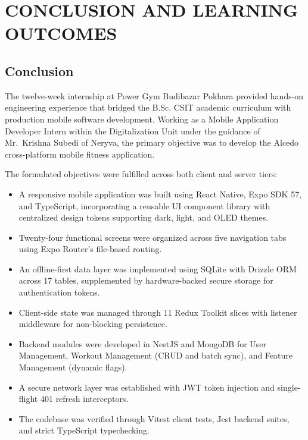 %
\chapter{CONCLUSION AND LEARNING OUTCOMES}

\section{Conclusion}
The twelve-week internship at Power Gym Budibazar Pokhara provided hands-on engineering experience that bridged the B.Sc. CSIT academic curriculum with production mobile software development. Working as a Mobile Application Developer Intern within the Digitalization Unit under the guidance of Mr.~Krishna Subedi of Neryva, the primary objective was to develop the Alcedo cross-platform mobile fitness application.

The formulated objectives were fulfilled across both client and server tiers:
\begin{itemize}
    \item A responsive mobile application was built using React Native, Expo SDK 57, and TypeScript, incorporating a reusable UI component library with centralized design tokens supporting dark, light, and OLED themes.
    \item Twenty-four functional screens were organized across five navigation tabs using Expo Router's file-based routing.
    \item An offline-first data layer was implemented using SQLite with Drizzle ORM across 17 tables, supplemented by hardware-backed secure storage for authentication tokens.
    \item Client-side state was managed through 11 Redux Toolkit slices with listener middleware for non-blocking persistence.
    \item Backend modules were developed in NestJS and MongoDB for User Management, Workout Management (CRUD and batch sync), and Feature Management (dynamic flags).
    \item A secure network layer was established with JWT token injection and single-flight 401 refresh interceptors.
    \item The codebase was verified through Vitest client tests, Jest backend suites, and strict TypeScript typechecking.
\end{itemize}

